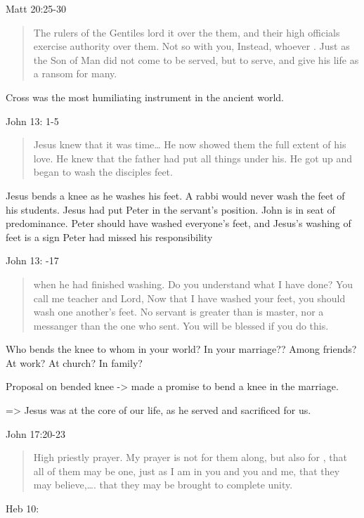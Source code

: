 \documentclass[
]{book}
\begin{document}
Matt 20:25-30

\begin{quote}
The rulers of the Gentiles lord it over the them, and their high officials exercise authority over them. Not so with you, Instead, whoever . Just as the Son of Man did not come to be served, but to serve, and give his life as a ransom for many.
\end{quote}

Cross was the most humiliating instrument in the ancient world.

John 13: 1-5

\begin{quote}
Jesus knew that it was time\ldots{} He now showed them the full extent of his love. He knew that the father had put all things under his. He got up and began to wash the disciples feet.
\end{quote}

Jesus bends a knee as he washes his feet. A rabbi would never wash the feet of his students. Jesus had put Peter in the servant's position. John is in seat of predominance. Peter should have washed everyone's feet, and Jesus's washing of feet is a sign Peter had missed his responsibility

John 13: -17

\begin{quote}
when he had finished washing. Do you understand what I have done? You call me teacher and Lord, Now that I have washed your feet, you should wash one another's feet. No servant is greater than is master, nor a messanger than the one who sent. You will be blessed if you do this.
\end{quote}

Who bends the knee to whom in your world? In your marriage?? Among friends? At work? At church? In family?

Proposal on bended knee -\textgreater{} made a promise to bend a knee in the marriage.

=\textgreater{} Jesus was at the core of our life, as he served and sacrificed for us.

John 17:20-23

\begin{quote}
High priestly prayer. My prayer is not for them along, but also for , that all of them may be one, just as I am in you and you and me, that they may believe,\ldots. that they may be brought to complete unity.
\end{quote}

Heb 10:
\end{document}
